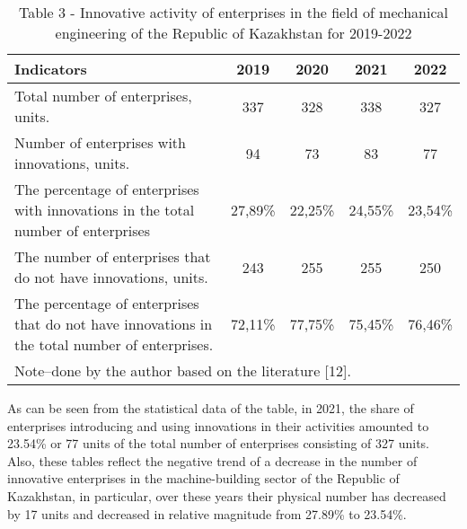 \begin{table}[H]
\caption*{Table 3 - Innovative activity of enterprises in the field of mechanical engineering of the Republic of Kazakhstan for 2019-2022}
\centering
\begin{tabular}{|lcccc|}
\hline
\multicolumn{1}{|l|}{\textbf{Indicators}} &
  \multicolumn{1}{c|}{\textbf{2019}} &
  \multicolumn{1}{c|}{\textbf{2020}} &
  \multicolumn{1}{c|}{\textbf{2021}} &
  \textbf{2022} \\ \hline
\multicolumn{1}{|p{0.5\textwidth}|}{Total number of enterprises, units.} &
  \multicolumn{1}{c|}{337} &
  \multicolumn{1}{c|}{328} &
  \multicolumn{1}{c|}{338} &
  327 \\ \hline
\multicolumn{1}{|p{0.5\textwidth}|}{Number of enterprises with innovations, units.} &
  \multicolumn{1}{c|}{94} &
  \multicolumn{1}{c|}{73} &
  \multicolumn{1}{c|}{83} &
  77 \\ \hline
\multicolumn{1}{|p{0.5\textwidth}|}{The percentage of enterprises with innovations in the total number of enterprises} &
  \multicolumn{1}{c|}{27,89\%} &
  \multicolumn{1}{c|}{22,25\%} &
  \multicolumn{1}{c|}{24,55\%} &
  23,54\% \\ \hline
\multicolumn{1}{|p{0.5\textwidth}|}{The number of enterprises that do not have innovations, units.} &
  \multicolumn{1}{c|}{243} &
  \multicolumn{1}{c|}{255} &
  \multicolumn{1}{c|}{255} &
  250 \\ \hline
\multicolumn{1}{|p{0.5\textwidth}|}{The percentage of enterprises that do not have innovations in the total number of enterprises.} &
  \multicolumn{1}{c|}{72,11\%} &
  \multicolumn{1}{c|}{77,75\%} &
  \multicolumn{1}{c|}{75,45\%} &
  76,46\% \\ \hline
\multicolumn{5}{|l|}{Note–done by the author based on the literature {[}12{]}.} \\ \hline
\end{tabular}
\end{table}

\begin{multicols}{2}
As can be seen from the statistical data of the table, in 2021, the
share of enterprises introducing and using innovations in their
activities amounted to 23.54\% or 77 units of the total number of
enterprises consisting of 327 units. Also, these tables reflect the
negative trend of a decrease in the number of innovative enterprises in
the machine-building sector of the Republic of Kazakhstan, in
particular, over these years their physical number has decreased by 17
units and decreased in relative magnitude from 27.89\% to 23.54\%.
\end{multicols}

